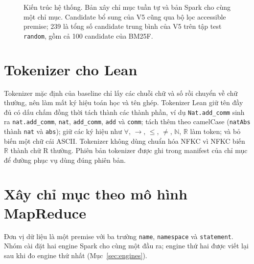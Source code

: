 \documentclass[11pt,a4paper,oneside]{report}
\newcommand{\code}[1]{\texttt{#1}}
\begin{document}
\begin{figure}[htbp]
\caption[Kiến trúc hệ thống]{Kiến trúc hệ thống. Bản xây chỉ mục tuần tự và bản Spark cho cùng một chỉ mục. Candidate bổ
sung của V5 cũng qua bộ lọc accessible premise; 239 là tổng số candidate trung bình của V5 trên tập test \code{random}, gồm
cả 100 candidate của BM25F.}\label{fig:arch}
\end{figure}

\section{Tokenizer cho Lean}

Tokenizer mặc định của baseline chỉ lấy các chuỗi chữ và số rồi chuyển về chữ thường, nên làm mất ký hiệu toán học và
tên ghép. Tokenizer Lean giữ tên đầy đủ có dấu chấm đồng thời tách thành các thành phần, ví dụ \code{Nat.add\_comm} sinh
ra \code{nat.add\_comm}, \code{nat}, \code{add\_comm}, \code{add} và \code{comm}; tách thêm theo camelCase (\code{natAbs}
thành \code{nat} và \code{abs}); giữ các ký hiệu như $\forall$, $\to$, $\le$, $\neq$, $\mathbb{N}$, $\mathbb{R}$ làm token;
và bỏ biến một chữ cái ASCII. Tokenizer không dùng chuẩn hóa NFKC vì NFKC biến $\mathbb{R}$ thành chữ R thường. Phiên bản
tokenizer được ghi trong manifest của chỉ mục để đường phục vụ dùng đúng phiên bản.

\section{Xây chỉ mục theo mô hình MapReduce}\label{sec:mapreduce}

Đơn vị dữ liệu là một premise với ba trường \code{name}, \code{namespace} và \code{statement}. Nhóm cài đặt hai engine Spark
cho cùng một đầu ra; engine thứ hai được viết lại sau khi đo engine thứ nhất (Mục~\ref{sec:engines}).
\end{document}
